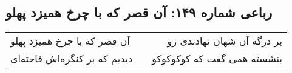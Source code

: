 \begin{center}
\section*{رباعی شماره ۱۴۹: آن قصر که با چرخ همیزد پهلو}
\label{sec:sh149}
\begin{longtable}{l p{0.5cm} r}
آن قصر که با چرخ همیزد پهلو
&&
بر درگه آن شهان نهادندی رو
\\
دیدیم که بر کنگره‌اش فاخته‌ای
&&
بنشسته همی گفت که کوکوکوکو
\\
\end{longtable}
\end{center}

